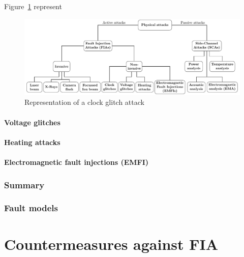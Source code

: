 Figure~\ref{fig:clock_glitch} represent

\begin{figure}[ht]
    \centering
    \includegraphics[page=4]{c2_soa/img/physicalAttacks.pdf}
    \caption{Representation of a clock glitch attack}
    \label{fig:clock_glitch}
\end{figure}

\paragraph{Voltage glitches}

\paragraph{Heating attacks}

\paragraph{Electromagnetic fault injections (EMFI)}

\subsubsection{Summary}

\subsubsection{Fault models}

\section{Countermeasures against FIA}
\label{section:countermeasuresAgainstFIA}

